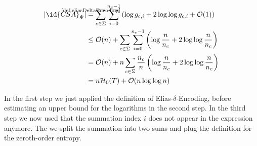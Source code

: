 \begin{align}
  \begin{aligned}
    \vert \id{CSA}_\Psi \vert
    &\stackrel{\mathclap{\text{\ref{def:eliasDeltaEncoding}}}}{=}
    \sum\limits_{c \in \Sigma} \sum\limits_{i = 0}^{n_c - 1}
    \left(\log g_{c,i} + 2 \log\log g_{c,i} + \mathcal{O}(1)\right) \\
    &\leq\mathcal{O}(n) + \sum\limits_{c \in \Sigma}\sum\limits_{i = 0}^{n_c - 1}
    \left(\log\frac{n}{n_c}+2\log\log\frac{n}{n_c}\right) \\
    &=\mathcal{O}(n) + n\sum\limits_{c \in \Sigma}\frac{n_c}{n}
    \left(\log\frac{n}{n_c}+2\log\log\frac{n}{n_c}\right) \\
    &=n\mathcal{H}_0(T) + \mathcal{O}(n \log\log n)
  \end{aligned}
\end{align}

In the first step we just applied the definition of Elias-$\delta$-Encoding, before estimating an upper bound for the logarithms in the second step. In the third step we now used that the summation index $i$ does not appear in the expression anymore. The we split the summation into two sums and plug the definition for the zeroth-order entropy.
